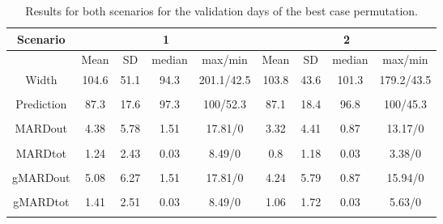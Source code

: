 \begin{sidewaystable}[hbtp]
	\centering
	\begin{tabular}{| c | c | c | c | c | c | c | c | c |}
	\hline
	Scenario & \multicolumn{4}{|c|}{1} & \multicolumn{4}{|c|}{2} \\
	\hline
	& Mean & SD & median & max/min & Mean & SD & median & max/min \\
	\hline
	Width & \multirow{2}{*}{104.6} & \multirow{2}{*}{51.1} & \multirow{2}{*}{94.3} & \multirow{2}{*}{201.1/42.5} & \multirow{2}{*}{103.8} & \multirow{2}{*}{43.6} & \multirow{2}{*}{101.3} & \multirow{2}{*}{179.2/43.5} \\[0pt]
	[mg/dL] & & & & & & & & \\
	\hline
	Prediction & \multirow{2}{*}{87.3} & \multirow{2}{*}{17.6} & \multirow{2}{*}{97.3} & \multirow{2}{*}{100/52.3} & \multirow{2}{*}{87.1} & \multirow{2}{*}{18.4} & \multirow{2}{*}{96.8} & \multirow{2}{*}{100/45.3} \\[0pt]
	[\%] & & & & & & & & \\
	\hline	
	MARDout & \multirow{2}{*}{4.38} & \multirow{2}{*}{5.78} & \multirow{2}{*}{1.51} & \multirow{2}{*}{17.81/0} & \multirow{2}{*}{3.32} & \multirow{2}{*}{4.41} & \multirow{2}{*}{0.87} & \multirow{2}{*}{13.17/0} \\[0pt]
	[\%] & & & & & & & & \\
	\hline
	MARDtot & \multirow{2}{*}{1.24} & \multirow{2}{*}{2.43} & \multirow{2}{*}{0.03} & \multirow{2}{*}{8.49/0} & \multirow{2}{*}{0.8} & \multirow{2}{*}{1.18} & \multirow{2}{*}{0.03} & \multirow{2}{*}{3.38/0} \\[0pt]
	[\%] & & & & & & & & \\
	\hline
	gMARDout & \multirow{2}{*}{5.08} & \multirow{2}{*}{6.27} & \multirow{2}{*}{1.51} & \multirow{2}{*}{17.81/0} & \multirow{2}{*}{4.24} & \multirow{2}{*}{5.79} & \multirow{2}{*}{0.87} & \multirow{2}{*}{15.94/0} \\[0pt]
	[\%] & & & & & & & & \\
	\hline
	gMARDtot & \multirow{2}{*}{1.41} & \multirow{2}{*}{2.51} & \multirow{2}{*}{0.03} & \multirow{2}{*}{8.49/0} & \multirow{2}{*}{1.06} & \multirow{2}{*}{1.72} & \multirow{2}{*}{0.03} & \multirow{2}{*}{5.63/0} \\[0pt]
	[\%] & & & & & & & & \\
	\hline
	\end{tabular}
\caption{Results for both scenarios for the validation days of the best case permutation.}
\label{tab:resultsbestcase}
\end{sidewaystable}

